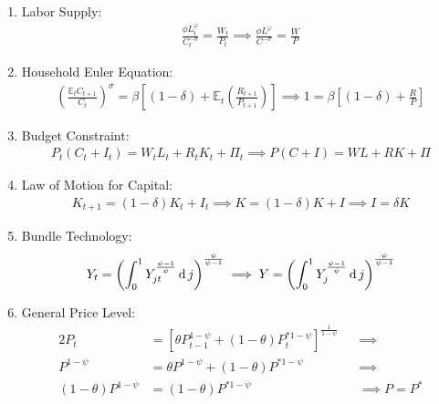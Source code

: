 \documentclass[
thesis.tex
]{subfiles}
\begin{document}
	\begin{enumerate}
		\item Labor Supply:
		\begin{align}
			\label{eq_v0:ss-household-labor-supply}
			\frac{\phi L_t^{\varphi}}{C_t^{-\sigma}} = \frac{W_t}{P_t} \implies
			\frac{\phi L^{\varphi}}{C^{-\sigma}} = \frac{W}{P}
		\end{align}
		
		\item Household Euler Equation: 
		\begin{align}
			\label{eq_v0:ss-household-euler-equation}
			\left( \frac{\mathbb{E}_t C_{t+1}}{C_t} \right)^\sigma = \beta \left[ (1-\delta) + \mathbb{E}_t \left(\frac{R_{t+1}}{P_{t+1}}\right) \right] \implies 
			1 = \beta \left[ (1-\delta) + \frac{R}{P} \right]
		\end{align}
		
		\item Budget Constraint: 
		\begin{align}
			\label{eq_v0:ss-household-budget-constraint}
			P_t (C_t + I_t) = W_t L_t + R_t K_t + \Pi_t \implies 
			P (C + I) = W L + R K + \Pi
		\end{align}
		
		\item Law of Motion for Capital:
		\begin{align}
			\label{eq_v0:ss-law-of-motion-for-capital}
			K_{t+1} = (1-\delta)K_t + I_t \implies
			K = (1-\delta)K + I \implies I = \delta K
		\end{align}
		
		\item Bundle Technology:
		\begin{align}
			\label{eq_v0:ss-final-good-firm-bundle-rule}
			Y_t = \left( \int_{0}^{1} Y_{jt}^{\frac{\psi-1}{\psi}} \operatorname{d} j \right)^{\frac{\psi}{\psi-1}} \implies 
			Y = \left( \int_{0}^{1} Y_{j}^{\frac{\psi-1}{\psi}} \operatorname{d} j \right)^{\frac{\psi}{\psi-1}}
		\end{align}
		
		\item General Price Level:
		\begin{alignat}{2}
			\label{eq_v0:ss-general-price-level}
			P_t &= \left[ \theta P_{t-1}^{1-\psi} + (1-\theta) P_t^{\ast 1-\psi} \right]^\frac{1}{1-\psi} &&\implies \nonumber \\
			P^{1-\psi} &= \theta P^{1-\psi} + (1-\theta) P^{\ast 1-\psi} &&\implies \nonumber \\ 
			(1-\theta) P^{1-\psi} &= (1-\theta) P^{\ast 1-\psi} &&\implies P = P^\ast
		\end{alignat}
		

\end{enumerate}
\end{document}
